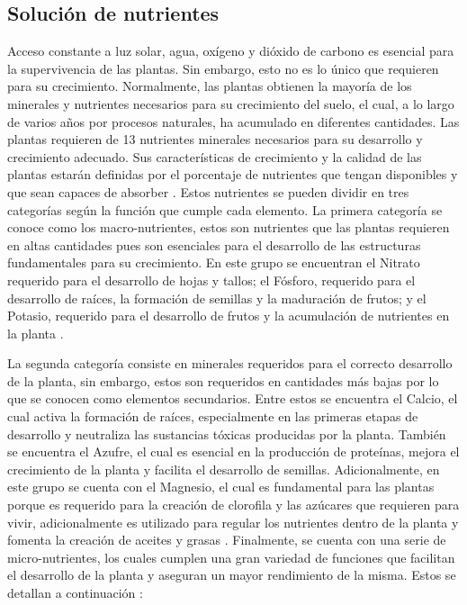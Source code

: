 \subsection*{Solución de nutrientes}
Acceso constante a luz solar, agua, oxígeno y dióxido de carbono es esencial para la supervivencia de las plantas. Sin embargo, esto no es lo único que requieren para su crecimiento. Normalmente, las plantas obtienen la mayoría de los minerales y nutrientes necesarios para su crecimiento del suelo, el cual, a lo largo de varios años por procesos naturales, ha acumulado en diferentes cantidades. Las plantas requieren de 13 nutrientes minerales necesarios para su desarrollo y crecimiento adecuado. Sus características de crecimiento y la calidad de las plantas estarán definidas por el porcentaje de nutrientes que tengan disponibles y que sean capaces de absorber \cite{marulanda_huerta_2003}. Estos nutrientes se pueden dividir en tres categorías según la función que cumple cada elemento. La primera categoría se conoce como los macro-nutrientes, estos son nutrientes que las plantas requieren en altas cantidades pues son esenciales para el desarrollo de las estructuras fundamentales para su crecimiento. En este grupo se encuentran el Nitrato requerido para el desarrollo de hojas y tallos; el Fósforo, requerido para el desarrollo de raíces, la formación de semillas y la maduración de frutos; y el Potasio, requerido para el desarrollo de frutos y la acumulación de nutrientes en la planta \cite{marulanda_huerta_2003}.

La segunda categoría consiste en minerales requeridos para el correcto desarrollo de la planta, sin embargo, estos son requeridos en cantidades más bajas por lo que se conocen como elementos secundarios. Entre estos se encuentra el Calcio, el cual activa la formación de raíces, especialmente en las primeras etapas de desarrollo y neutraliza las sustancias tóxicas producidas por la planta. También se encuentra el Azufre, el cual es esencial en la producción de proteínas, mejora el crecimiento de la planta y facilita el desarrollo de semillas. Adicionalmente, en este grupo se cuenta con el Magnesio, el cual es fundamental para las plantas porque es requerido para la creación de clorofila y las azúcares que requieren para vivir, adicionalmente es utilizado para regular los nutrientes dentro de la planta y fomenta la creación de aceites y grasas \cite{marulanda_huerta_2003}. Finalmente, se cuenta con una serie de micro-nutrientes, los cuales cumplen una gran variedad de funciones que facilitan el desarrollo de la planta y aseguran un mayor rendimiento de la misma. Estos se detallan a continuación \cite{atlas_scientific_nutrient_2023}:

